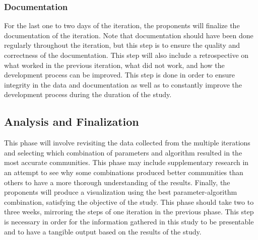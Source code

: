 \subsubsection{Documentation}

For the last one to two days of the iteration, the proponents will finalize the documentation of the iteration. Note that documentation should have been done regularly throughout the iteration, but this step is to ensure the quality and correctness of the documentation. This step will also include a retrospective on what worked in the previous iteration, what did not work, and how the development process can be improved. This step is done in order to ensure integrity in the data and documentation as well as to constantly improve the development process during the duration of the study.

\subsection{Analysis and Finalization}

This phase will involve revisiting the data collected from the multiple iterations and selecting which combination of parameters and algorithm resulted in the most accurate communities. This phase may include supplementary research in an attempt to see why some combinations produced better communities than others to have a more thorough understanding of the results. Finally, the proponents will produce a visualization using the best parameter-algorithm combination, satisfying the objective of the study. This phase should take two to three weeks, mirroring the steps of one iteration in the previous phase. This step is necessary in order for the information gathered in this study to be presentable and to have a tangible output based on the results of the study.

